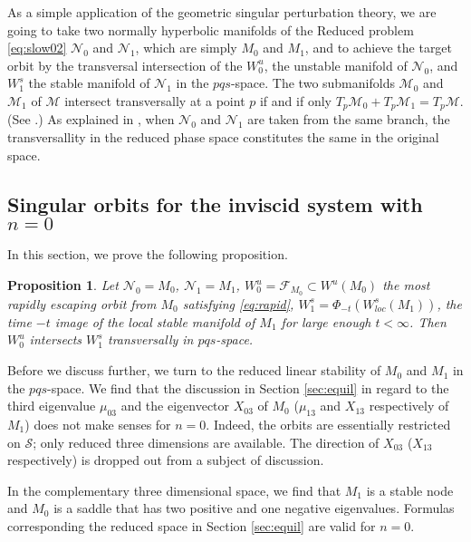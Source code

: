 \documentclass[a4paper,11pt]{article}
\newtheorem{proposition}{Proposition}[section]
\theoremstyle{remark}
\begin{document}
As a simple application of the geometric singular perturbation theory, we are going to take two normally hyperbolic manifolds of the Reduced problem \eqref{eq:slow02} $\mathcal{N}_0$ and $\mathcal{N}_1$, which are simply $M_0$ and $M_1$, and to achieve the target orbit by the transversal intersection of the $W^u_0$, the unstable manifold of $\mathcal{N}_0$, and $W^s_1$ the stable manifold of $\mathcal{N}_1$ in the $pqs$-space. The two submanifolds $\mathcal{M}_0$ and $\mathcal{M}_1$ of $\mathcal{M}$ intersect transversally at a point $p$ if and if only $T_p\mathcal{M}_0 + T_p\mathcal{M}_1 = T_p\mathcal{M}$. (See \cite[Definition 3.1]{Sz1991}.) As explained in \cite{Sz1991}, when $\mathcal{N}_0$ and $\mathcal{N}_1$ are taken from the same branch, the transversallity in the reduced phase space constitutes the same in the original space.

\subsection{Singular orbits for the inviscid system with $n=0$}
In this section, we prove the following proposition.
\begin{proposition} \label{prop:singular}
 Let $\mathcal{N}_0=M_0$, $\mathcal{N}_1=M_1$, $W^u_0=\mathcal{F}_{M_0}\subset W^u(M_0)$ the most rapidly escaping orbit from $M_0$ satisfying \eqref{eq:rapid}, $W^s_1=\Phi_{-t}(W^s_{loc}(M_1))$, the time $-t$ image of the local stable manifold of $M_1$ for large enough $t<\infty$. Then $W^u_0$ intersects $W^s_1$ transversally in $pqs$-space.
\end{proposition}
Before we discuss further, we turn to the reduced linear stability of $M_0$ and $M_1$ in the $pqs$-space. We find that the discussion in Section \ref{sec:equil} in regard to the third eigenvalue $\mu_{03}$ and the eigenvector $X_{03}$ of $M_0$ ($\mu_{13}$ and $X_{13}$ respectively of $M_1$) does not make senses for $n=0$. Indeed, the orbits are essentially restricted on $\mathcal{S}$; only reduced three dimensions are available. The direction of $X_{03}$ ($X_{13}$ respectively) is dropped out from a subject of discussion.

In the complementary three dimensional space, we find that $M_1$ is a stable node and $M_0$ is a saddle that has two positive and one negative eigenvalues. Formulas corresponding the reduced space in Section \ref{sec:equil} are valid for $n=0$.%
\end{document}
